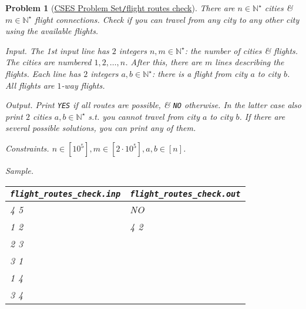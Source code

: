 \documentclass{article}
\newtheorem{problem}{Problem}
\begin{document}
\begin{problem}[\href{https://cses.fi/problemset/task/1682}{CSES Problem Set{\tt/}flight routes check}]
    There are $n\in\mathbb{N}^\star$ cities \& $m\in\mathbb{N}^\star$ flight connections. Check if you can travel from any city to any other city using the available flights.
    \item {\sf Input.} The 1st input line has $2$ integers $n,m\in\mathbb{N}^\star$: the number of cities \& flights. The cities are numbered $1,2,\ldots,n$. After this, there are $m$ lines describing the flights. Each line has $2$ integers $a,b\in\mathbb{N}^\star$: there is a flight from city $a$ to city $b$. All flights are $1$-way flights.
    \item {\sf Output.} Print {\tt YES} if all routes are possible, \& {\tt NO} otherwise. In the latter case also print $2$ cities $a,b\in\mathbb{N}^\star$ s.t. you cannot travel from city $a$ to city $b$. If there are several possible solutions, you can print any of them.
    \item {\sf Constraints.} $n\in[10^5],m\in[2\cdot10^5],a,b\in[n]$.
    \item {\sf Sample.}
    \begin{table}[H]
        \centering
        \begin{tabular}{|l|l|}
            \hline
            \verb|flight_routes_check.inp| & \verb|flight_routes_check.out| \\
            \hline
            4 5 & NO \\
            1 2 & 4 2 \\
            2 3 & \\
            3 1 & \\
            1 4 & \\
            3 4 & \\
            \hline
        \end{tabular}
    \end{table}
\end{problem}
\end{document}

